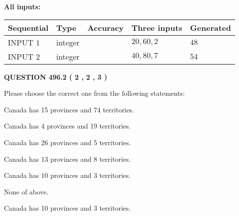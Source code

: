 \documentclass[12pt]{article}
\begin{document}
   
   
   
\noindent{}
   
   
   
   
\noindent\vspace{0.1in}\hspace{-0.08in} {\textbf{\Large{All inputs: }}}
   
   
  
  
\noindent\begin{tabular}{|l|l|l|l|l|}
\hline
 Sequential & Type & Accuracy & Three inputs & Generated \\ 
\hline
 
 
  INPUT $  1 $ & integer &  & $
 20
 , 
 60
 , 
 2
 $ & $ 48 $ 
 \\  \hline  
 
 
  INPUT $  2 $ & integer &  & $
 40
 , 
 80
 , 
 7
 $ & $ 54 $ 
 \\  \hline  
 \end{tabular}
   
   
  
\vspace{0.2in}
  
{\textbf{\Large{QUESTION
496.2 
 ( 2 , 2 , 3 )
}}}
  
  
Please choose the correct one from the following statements:
 
 
Canada has  15 provinces and  74 territories.
 
 
Canada has   4 provinces and  19 territories.
 
 
Canada has  26 provinces and  5 territories.
 
 
Canada has  13 provinces and  8 territories.
 
 
Canada has 10  provinces and 3 territories.
 
 
 None of above.
 
 
\noindent{}
 
 
Canada has 10  provinces and 3 territories.
 
 
\noindent{}
 
 
   
\end{document}

